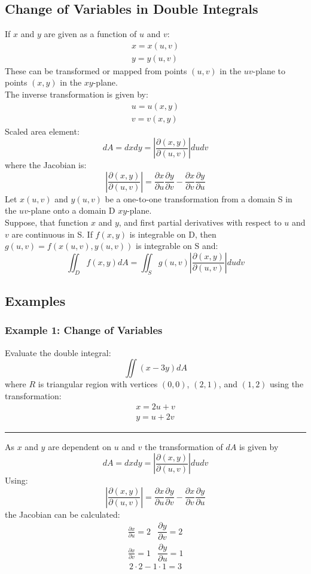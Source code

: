 \subsection{Change of Variables in Double Integrals}
If $x$ and $y$ are given as a function of $u$ and $v$:
$$\begin{array}{c}
x=x(u,v)\\
y=y(u,v)
\end{array}$$
These can be transformed or mapped from points $(u,v)$ in the $uv$-plane to points $(x,y)$ in the $xy$-plane.\\
The inverse transformation is given by:
$$\begin{array}{c}
  u=u(x,y)\\
  v=v(x,y)
\end{array}$$
Scaled area element:
$$dA = dxdy=\left|\frac{\partial(x,y)}{\partial(u,v)}\right|dudv$$
where the Jacobian is:
$$\left|\frac{\partial(x,y)}{\partial(u,v)}\right|=\frac{\partial x}{\partial u}\frac{\partial y}{\partial v}-\frac{\partial x}{\partial v}\frac{\partial y}{\partial u}$$
Let $x(u, v)$ and $y(u,v)$ be a one-to-one transformation from a domain S in the $uv$-plane onto a domain D
$xy$-plane.\\
Suppose, that function $x$ and $y$, and first partial derivatives with respect to $u$ and $v$ are continuous in S.
If $f(x,y)$ is integrable on D, then $g(u,v)=f(x(u,v),y(u,v))$ is integrable on S and:
$$\iint_D f(x,y)dA=\iint_S g(u,v)\left|\frac{\partial(x,y)}{\partial(u,v)}\right|dudv$$

\subsection{Examples}
\subsubsection{Example 1: Change of Variables}
Evaluate the double integral:
$$\iint (x-3y)dA$$
where $R$ is triangular region with vertices $(0,0)$, $(2,1)$, and $(1,2)$ using the transformation:
$$\begin{array}{c}
  x=2u+v\\
  y=u+2v
\end{array}$$
\rule{\textwidth}{0.5pt}
As $x$ and $y$ are dependent on $u$ and $v$ the transformation of $dA$ is given by 
$$dA = dxdy=\left|\frac{\partial(x,y)}{\partial(u,v)}\right|dudv$$
Using:
$$\left|\frac{\partial(x,y)}{\partial(u,v)}\right|=\frac{\partial x}{\partial u}\frac{\partial y}{\partial v}-\frac{\partial x}{\partial v}\frac{\partial y}{\partial u}$$
the Jacobian can be calculated:
\begin{eqnarray*}
  \frac{\partial x}{\partial u}=2&
  \dfrac{\partial y}{\partial v}=2\\
  \frac{\partial x}{\partial v}=1&
  \dfrac{\partial y}{\partial u}=1
\end{eqnarray*}
$$2\cdot2-1\cdot1=3$$

